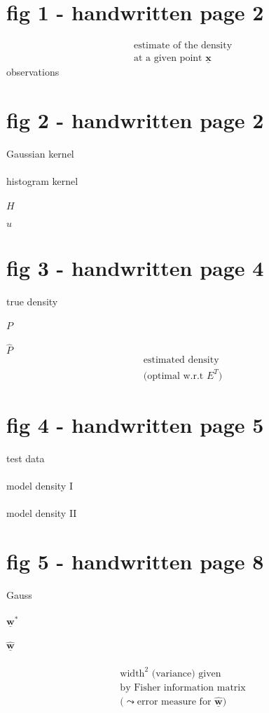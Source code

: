 \documentclass[a4paper,11pt]{article}
\begin{document}
\renewcommand{\vec}[1]{\ensuremath{\underline{\mathbf{#1}}}}
\newcommand{\corresponds}{\ensuremath{\widehat{=}}}

\section{fig 1 - handwritten page 2}
\[\substack{	\text{estimate of the density} \\
		\text{at a given point } \vec{x}}
\]
observations

\section{fig 2 - handwritten page 2}
Gaussian kernel \\\\
histogram kernel\\\\
$H$\\\\
$u$

\section{fig 3 - handwritten page 4}
true density \\\\
$P$\\\\
$\widehat{P}$
\[ \substack{ 	\text{estimated density} \\
		\text{(optimal w.r.t } E^T \text{)} }
\]

\section{fig 4 - handwritten page 5}
test data \\\\
model density I \\\\
model density II

\section{fig 5 - handwritten page 8}
Gauss\\\\
$\vec{w}^*$ \\\\
$\widehat{\vec{w}}$\\\\
\[ \substack{ 	\text{width}^2 \text{ (variance) given} \\
		\text{by Fisher information matrix} \\
		\text{(} \leadsto \text{error measure for } 
			\widehat{\vec{w}} \text{)}}
\]
	
\end{document}
